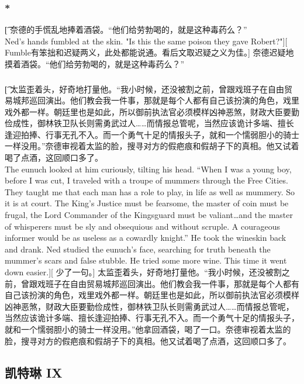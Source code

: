 \documentclass[12pt,a4paper]{article}
\begin{document}
\subsubsection{\color{red}*}\t[	
	奈德的手慌乱地捧着酒袋。“他们给劳勃喝的，就是这种毒药么？”\\
	Ned's hands fumbled at the skin. "Is this the same poison they gave Robert?"][
	Fumble有笨拙和迟疑两义，此处都能说通。看后文取迟疑之义为佳。]
	奈德迟疑地摸着酒袋。“他们给劳勃喝的，就是这种毒药么？”
\subsubsection{}\t[	
	太监歪着头，好奇地打量他。“我小时候，还没被割之前，曾跟戏班子在自由贸易城邦巡回演出。他们教会我一件事，那就是每个人都有自己该扮演的角色，戏里戏外都一样。朝廷里也是如此，所以御前执法官必须模样凶神恶煞，财政大臣要勤俭成性，御林铁卫队长则需勇武过人……而情报总管呢，当然应该诡计多端、擅长逢迎拍捧、行事无孔不入。而一个勇气十足的情报头子，就和一个懦弱胆小的骑士一样没用。”奈德审视着太监的脸，搜寻对方的假疤痕和假胡子下的真相。他又试着喝了点酒，这回顺口多了。\\
	The eunuch looked at him curiously, tilting his head. “When I was a young boy, before I was cut, I traveled with a troupe of mummers through the Free Cities. They taught me that each man has a role to play, in life as well as mummery. So it is at court. The King's Justice must be fearsome, the master of coin must be frugal, the Lord Commander of the Kingsguard must be valiant\ldots and the master of whisperers must be sly and obsequious and without scruple. A courageous informer would be as useless as a cowardly knight.” He took the wineskin back and drank. Ned studied the eunuch's face, searching for truth beneath the mummer's scars and false stubble. He tried some more wine. This time it went down easier.][
	少了一句。]
	太监歪着头，好奇地打量他。“我小时候，还没被割之前，曾跟戏班子在自由贸易城邦巡回演出。他们教会我一件事，那就是每个人都有自己该扮演的角色，戏里戏外都一样。朝廷里也是如此，所以御前执法官必须模样凶神恶煞，财政大臣要勤俭成性，御林铁卫队长则需勇武过人……而情报总管呢，当然应该诡计多端、擅长逢迎拍捧、行事无孔不入。而一个勇气十足的情报头子，就和一个懦弱胆小的骑士一样没用。”他拿回酒袋，喝了一口。奈德审视着太监的脸，搜寻对方的假疤痕和假胡子下的真相。他又试着喝了点酒，这回顺口多了。
	
\subsection{凯特琳 IX}
\end{document}
